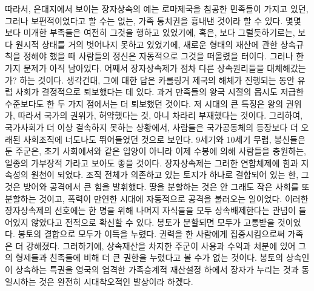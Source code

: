 따라서,
은대지에서 보이는 장자상속의 예는
로마제국을 침공한 민족들이 가지고 있던, 그러나 보편적이었다고 할 수는 없는,
가족 통치권을 흉내낸 것이라 할 수 있다.
몇몇 보다 미개한 부족들은 여전히 그것을 행하고 있었기에,
혹은, 보다 그럴듯하기로는, 보다 원시적 상태를 거의 벗어나지 못하고 있었기에,
새로운 형태의 재산에 관한 상속규칙을 정해야 했을 때
사람들의 정신은 자동적으로 그것을 떠올렸을 터이다.
그러나 한 가지 문제가 아직 남아있다.
어째서 장자상속제가 점차 다른 상속원리들을 대체해갔는가? 하는 것이다.
생각건대, 그에 대한 답은
카롤링거 제국의 해체가 진행되는 동안 유럽 사회가 결정적으로 퇴보했다는 데 있다.
과거 만족들의 왕국 시절의
몹시도 저급한 수준보다도 한 두 가지 점에서는 더 퇴보했던 것이다.
저 시대의 큰 특징은 왕의 권위가, 따라서 국가의 권위가,
허약했다는 것, 아니 차라리 부재했다는 것이다.
그리하여, 국가사회가 더 이상 결속하지 못하는 상황에서,
사람들은
국가공동체의 등장보다 더 오래된 사회조직에
너도나도 뛰어들었던 것으로 보인다.
9세기와 10세기 무렵, 봉신들은 둔 주군은,
초기 사회에서와 같은 입양이 아니라
이제 수봉에 의해 사람들을 충원하는,
일종의 가부장적 가라고 보아도 좋을 것이다.
장자상속제는
그러한 연합체제에
힘과 지속성의 원천이 되었다.
조직 전체가 의존하고 있는 토지가 하나로 결합되어 있는 한,
그것은 방어와 공격에서 큰 힘을 발휘했다.
땅을 분할하는 것은 안 그래도 작은 사회를 또 분할하는 것이고,
폭력이 만연한 시대에 자동적으로 공격을 불러오는 일이었다.
이러한 장자상속제의 선호에는
한 명을 위해 나머지 자식들을 모두 상속배제한다는 관념이
들어있지 않았다고
전적으로 확신할 수 있다.
봉토가 분할되면 모두가 고통받을 것이었다.
봉토의 결합으로 모두가 이득을 누렸다.
권력을 한 사람에게 집중시킴으로써 가족은 더 강해졌다.
그러하기에, 상속재산을 차지한 주군이
사용과 수익과 처분에 있어
그의 형제들과 친족들에 비해
더 큰 권한을 누렸다고 볼 수가 없는 것이다.
봉토의 상속인이 상속하는 특권을
영국의 엄격한 가족승계적 재산설정 하에서 장자가 누리는 것과
동일시하는 것은 완전히 시대착오적인 발상이라 하겠다.


